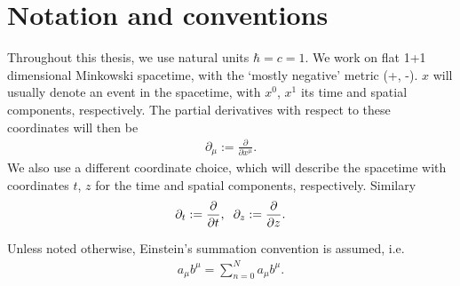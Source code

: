 \newpage
\section*{Notation and conventions}

Throughout this thesis, we use natural units $\hbar = c = 1$. We work on flat 1+1 dimensional Minkowski spacetime, with the `mostly negative' metric (+, -). $x$ will usually denote an event in the spacetime, with $x^{0}$, $x^{1}$ its time and spatial components, respectively. The partial derivatives with respect to these coordinates will then be 
\begin{align}
\partial_\mu := 	\frac{\partial}{\partial x^{\mu}}.
\end{align}
We also use a different coordinate choice,  which will describe the spacetime with coordinates $t$, $z$ for the time and spatial components, respectively. Similary 
\begin{align}
	\partial_t:= 	\frac{\partial}{\partial t}, \hspace{0.2cm}  \hfill
\partial_z:= 	\frac{\partial}{\partial z}.
\end{align}

Unless noted otherwise, Einstein's summation convention is assumed, i.e. 
\begin{align}
	a_\mu b^{\mu}= \sum_{n=0}^{N} a_\mu b^{\mu}.
\end{align}

